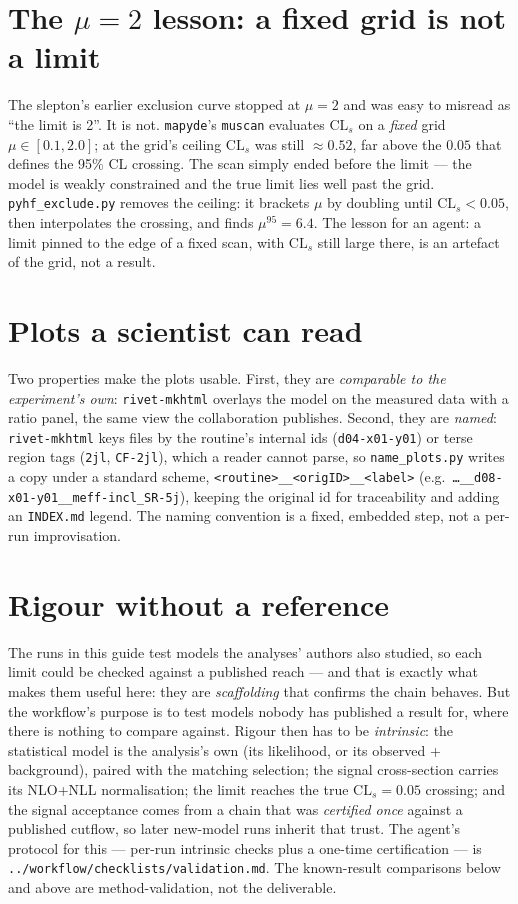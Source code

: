 \documentclass[11pt,oneside]{report}
\newcommand{\code}[1]{\texttt{#1}}
\begin{document}
\section{The $\mu=2$ lesson: a fixed grid is not a limit}\label{sec:mu2}
The slepton's earlier exclusion curve stopped at $\mu=2$ and was easy to misread as ``the limit is
2''. It is not. \texttt{mapyde}'s \code{muscan} evaluates $\mathrm{CL}_s$ on a \emph{fixed} grid
$\mu\in[0.1,2.0]$; at the grid's ceiling $\mathrm{CL}_s$ was still $\approx0.52$, far above the
$0.05$ that defines the 95\% CL crossing. The scan simply ended before the limit --- the model is
weakly constrained and the true limit lies well past the grid. \code{pyhf\_exclude.py} removes the
ceiling: it brackets $\mu$ by doubling until $\mathrm{CL}_s<0.05$, then interpolates the crossing, and
finds $\mu^{95}=6.4$. The lesson for an agent: a limit pinned to the edge of a fixed scan, with
$\mathrm{CL}_s$ still large there, is an artefact of the grid, not a result.

\section{Plots a scientist can read}
Two properties make the plots usable. First, they are \emph{comparable to the experiment's own}:
\code{rivet-mkhtml} overlays the model on the measured data with a ratio panel, the same view the
collaboration publishes. Second, they are \emph{named}: \code{rivet-mkhtml} keys files by the
routine's internal ids (\code{d04-x01-y01}) or terse region tags (\code{2jl}, \code{CF-2jl}), which a
reader cannot parse, so \code{name\_plots.py} writes a copy under a standard scheme,
\code{<routine>\_\_<origID>\_\_<label>} (e.g.\ \code{\dots\_\_d08-x01-y01\_\_meff-incl\_SR-5j}), keeping
the original id for traceability and adding an \code{INDEX.md} legend. The naming convention is a
fixed, embedded step, not a per-run improvisation.

\section{Rigour without a reference}
The runs in this guide test models the analyses' authors also studied, so each limit could be checked
against a published reach --- and that is exactly what makes them useful here: they are
\emph{scaffolding} that confirms the chain behaves. But the workflow's purpose is to test models
nobody has published a result for, where there is nothing to compare against. Rigour then has to be
\emph{intrinsic}: the statistical model is the analysis's own (its likelihood, or its observed +
background), paired with the matching selection; the signal cross-section carries its NLO+NLL
normalisation; the limit reaches the true $\mathrm{CL}_s=0.05$ crossing; and the signal acceptance
comes from a chain that was \emph{certified once} against a published cutflow, so later new-model runs
inherit that trust. The agent's protocol for this --- per-run intrinsic checks plus a one-time
certification --- is \code{../workflow/checklists/validation.md}. The known-result comparisons below
and above are method-validation, not the deliverable.
\end{document}
